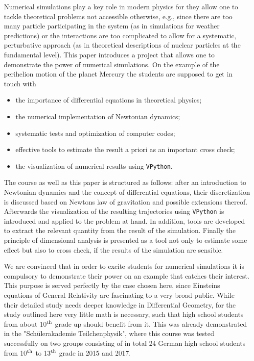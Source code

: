 \documentclass[12pt,ngerman,american]{iopart}
\begin{document}
Numerical simulations play a key role in modern physics for they allow one to tackle theoretical problems not accessible otherwise, e.g., since there are too many particle participating in the system (as in simulations for weather predictions) or the interactions are too complicated to allow for a systematic, perturbative approach (as in theoretical descriptions of nuclear particles at the fundamental level).
This paper introduces a project that allows one to demonstrate the power of numerical simulations.
On the example of the perihelion motion of the planet Mercury the students are supposed to get in touch with
\begin{itemize}
\item the importance of differential equations in theoretical physics;
\item the numerical implementation of Newtonian dynamics;
\item systematic tests and optimization of computer codes;
\item effective tools to estimate the result a priori as an important cross check;
\item the visualization of numerical results using \texttt{VPython}.
\end{itemize}
The course as well as this paper is structured as follows: after an introduction to Newtonian dynamics and the concept of differential equations, their
discretization is discussed based on Newtons law of gravitation and possible extensions thereof.
Afterwards the visualization of the resulting trajectories using \texttt{VPython} is introduced and applied to the problem at hand. In addition,
 tools are developed to extract the relevant quantity from the result of the simulation.
Finally the principle of dimensional analysis is presented as a tool not only to estimate some effect but also to cross check, if the results of the simulation are sensible.

We are convinced that in order to excite students for numerical simulations it is compulsory to demonstrate their power on an example that catches their interest.
This purpose is served perfectly by the case chosen here, since Einsteins equations of General Relativity are fascinating to a very broad public.
While their detailed study needs deeper knowledge in Differential Geometry, for the study outlined here very little math is necessary, such that high school students from about 10$^{\rm th}$ grade up should benefit from it.
This was already demonstrated in the "Schülerakademie Teilchenphysik", where this course was tested successfully on two groups consisting of in total 24
German high school students from 10$^{\rm th}$ to 13$^{\rm th}$ grade in 2015 and 2017.
\end{document}
